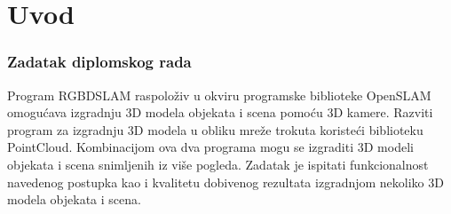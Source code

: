 \newpage

\setcounter{page}{1}
\setcounter{figure}{0}
\section{Uvod}%
\label{sec:Uvod}

\subsubsection{Zadatak diplomskog rada} %
\label{ssub:Zadatak diplomskog rada}

Program RGBDSLAM raspoloživ u okviru programske biblioteke OpenSLAM
omogućava izgradnju 3D modela objekata i scena pomoću 3D kamere.
Razviti program za izgradnju 3D modela u obliku mreže trokuta koristeći
biblioteku PointCloud. Kombinacijom ova dva programa mogu se izgraditi
3D modeli objekata i scena snimljenih iz više pogleda. Zadatak je
ispitati funkcionalnost navedenog postupka kao i kvalitetu dobivenog
rezultata izgradnjom nekoliko 3D modela objekata i scena.

